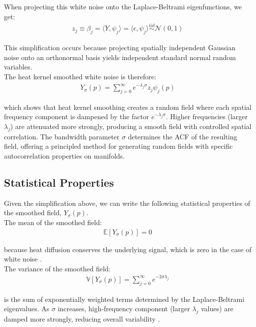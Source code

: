 \documentclass{article}
\begin{document}
\noindent When projecting this white noise onto the Laplace-Beltrami eigenfunctions, we get:
\begin{align}
z_j \equiv \beta_j = \langle Y, \psi_j \rangle = \langle \epsilon, \psi_j \rangle \overset{iid}{\sim} \mathcal{N}(0, 1)
\end{align}

\noindent This simplification occurs because projecting spatially independent Gaussian noise onto an orthonormal basis yields independent standard normal random variables.\\

The heat kernel smoothed white noise is therefore:
\begin{align}
Y_\sigma(p) = \sum_{j=0}^\infty e^{-\lambda_j \sigma} z_j \psi_j(p)
\end{align}

\noindent which shows that heat kernel smoothing creates a random field where each spatial frequency component is dampened by the factor $e^{-\lambda_j \sigma}$. Higher frequencies (larger $\lambda_j$) are attenuated more strongly, producing a smooth field with controlled spatial correlation. The bandwidth parameter $\sigma$ determines the ACF of the resulting field, offering a principled method for generating random fields with specific autocorrelation properties on manifolds.

\subsection{Statistical Properties}
Given the simplification above, we can write the following statistical properties of the smoothed field, $Y_\sigma(p)$.\\

The mean of the smoothed field:
\begin{align}
    \mathbb{E}[Y_\sigma(p)] = 0
\end{align}

\noindent because heat diffusion conserves the underlying signal, which is zero in the case of white noise \citep{kushnarev_heat_2019}.\\

The variance of the smoothed field:
\begin{align}
    \mathbb{V}[Y_\sigma(p)] = \sum_{j=0}^\infty e^{-2\sigma\lambda_j}
\end{align}

\noindent is the sum of exponentially weighted terms determined by the Laplace-Beltrami eigenvalues. As $\sigma$ increases, high-frequency component (larger $\lambda_j$ values) are damped more strongly, reducing overall variability \citep{kushnarev_heat_2019}.\\
\end{document}
